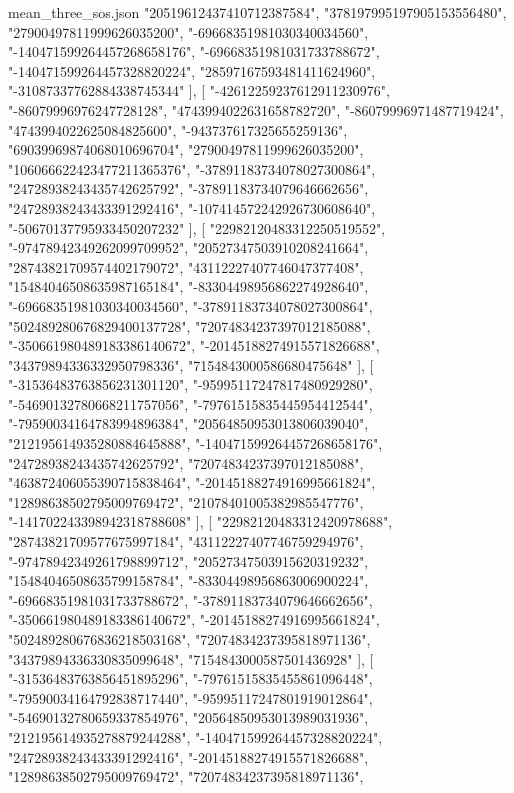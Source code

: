 \begin{filecontents*}[overwrite]{mean_three_sos.json}
    "20519612437410712387584",
    "378197995197905153556480",
    "27900497811999626035200",
    "-69668351981030340034560",
    "-140471599264457268658176",
    "-69668351981031733788672",
    "-140471599264457328820224",
    "28597167593481411624960",
    "-31087337762884338745344"
   ],
   [
    "-42612259237612911230976",
    "-86079996976247728128",
    "4743994022631658782720",
    "-86079996971487719424",
    "4743994022625084825600",
    "-943737617325655259136",
    "69039969874068010696704",
    "27900497811999626035200",
    "106066622423477211365376",
    "-37891183734078027300864",
    "24728938243435742625792",
    "-37891183734079646662656",
    "24728938243433391292416",
    "-107414572242926730608640",
    "-50670137795933450207232"
   ],
   [
    "22982120483312250519552",
    "-97478942349262099709952",
    "20527347503910208241664",
    "28743821709574402179072",
    "43112227407746047377408",
    "15484046508635987165184",
    "-83304498956862274928640",
    "-69668351981030340034560",
    "-37891183734078027300864",
    "502489280676829400137728",
    "72074834237397012185088",
    "-350661980489183386140672",
    "-20145188274915571826688",
    "34379894336332950798336",
    "7154843000586680475648"
   ],
   [
    "-31536483763856231301120",
    "-95995117247817480929280",
    "-54690132780668211757056",
    "-79761515835445954412544",
    "-79590034164783994896384",
    "20564850953013806039040",
    "212195614935280884645888",
    "-140471599264457268658176",
    "24728938243435742625792",
    "72074834237397012185088",
    "463872406055390715838464",
    "-20145188274916995661824",
    "12898638502795009769472",
    "21078401005382985547776",
    "-141702243398942318788608"
   ],
   [
    "22982120483312420978688",
    "28743821709577675997184",
    "43112227407746759294976",
    "-97478942349261798899712",
    "20527347503915620319232",
    "15484046508635799158784",
    "-83304498956863006900224",
    "-69668351981031733788672",
    "-37891183734079646662656",
    "-350661980489183386140672",
    "-20145188274916995661824",
    "502489280676836218503168",
    "72074834237395818971136",
    "34379894336330835099648",
    "7154843000587501436928"
   ],
   [
    "-31536483763856451895296",
    "-79761515835455861096448",
    "-79590034164792838717440",
    "-95995117247801919012864",
    "-54690132780659337854976",
    "20564850953013989031936",
    "212195614935278879244288",
    "-140471599264457328820224",
    "24728938243433391292416",
    "-20145188274915571826688",
    "12898638502795009769472",
    "72074834237395818971136",

\end{filecontents*}
